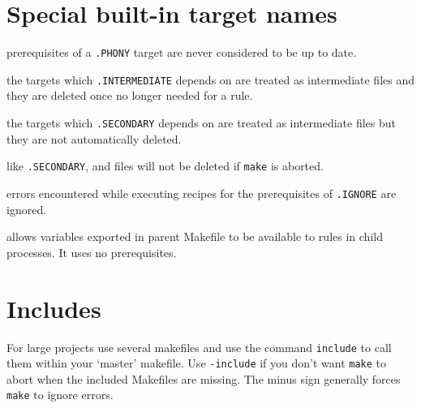 \hfill%
\begin{minipage}[t]{0.3\textwidth}
\section{Special built-in target names}
\begin{description}[font=\ttfamily, itemsep=0pt]
    \item[.PHONY] prerequisites of a \texttt{.PHONY} target are never considered to be up to date.
    \item[.INTERMEDIATE] the targets which \texttt{.INTERMEDIATE} depends on are treated as intermediate files and they are deleted once no longer needed for a rule.
    \item[.SECONDARY] the targets which \texttt{.SECONDARY} depends on are treated as intermediate files but they are not automatically deleted.
    \item[.PRECIOUS] like \texttt{.SECONDARY}, and files will not be deleted if \texttt{make} is aborted.
    \item[.IGNORE] errors encountered while executing recipes for the prerequisites of \texttt{.IGNORE} are ignored.
    \item[.EXPORT\_ALL\_VARIABLES] allows variables exported in parent Makefile to be available to rules in child processes. It uses no prerequisites.
\end{description}
\sectionspace
\end{minipage}

\sectionspace
\section{Includes}
\noindent For large projects use several makefiles and use the command \texttt{include} to call them within your `master' makefile. Use \texttt{-include}  if you don't want \texttt{make} to abort when the included Makefiles are missing. The minus sign generally forces \texttt{make} to ignore errors.
%
\sectionspace
